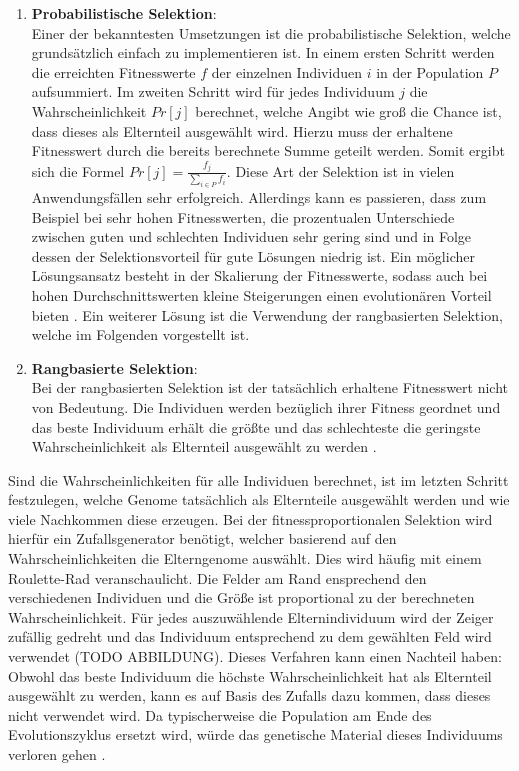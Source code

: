 \begin{enumerate}
	\item \textbf{Probabilistische Selektion}:\\
	Einer der bekanntesten Umsetzungen ist die probabilistische Selektion, welche grundsätzlich einfach zu implementieren ist. In einem ersten Schritt werden die erreichten Fitnesswerte $f$ der einzelnen Individuen $i$ in der Population $P$ aufsummiert. Im zweiten Schritt wird für jedes Individuum $j$ die Wahrscheinlichkeit $Pr[j]$ berechnet, welche Angibt wie groß die Chance ist, dass dieses als Elternteil ausgewählt wird. Hierzu muss der erhaltene Fitnesswert durch die bereits berechnete Summe geteilt werden. Somit ergibt sich die Formel $Pr[j]=\frac{f_j}{\sum_{i \in P}f_i}$. Diese Art der Selektion ist in vielen Anwendungsfällen sehr erfolgreich. Allerdings kann es passieren, dass zum Beispiel bei sehr hohen Fitnesswerten, die prozentualen Unterschiede zwischen guten und schlechten Individuen sehr gering sind und in Folge dessen der Selektionsvorteil für gute Lösungen niedrig ist. Ein möglicher Lösungsansatz besteht in der Skalierung der Fitnesswerte, sodass auch bei hohen Durchschnittswerten kleine Steigerungen einen evolutionären Vorteil bieten \cite{weicker2015evolutionare}. Ein weiterer Lösung ist die Verwendung der rangbasierten Selektion, welche im Folgenden vorgestellt ist.
	
	\item  \textbf{Rangbasierte Selektion}:\\
	Bei der rangbasierten Selektion ist der tatsächlich erhaltene Fitnesswert nicht von Bedeutung. Die Individuen werden bezüglich ihrer Fitness geordnet und das beste Individuum erhält die größte und das schlechteste die geringste Wahrscheinlichkeit als Elternteil ausgewählt zu werden \cite{weicker2015evolutionare}. 
\end{enumerate}
Sind die Wahrscheinlichkeiten für alle Individuen berechnet, ist im letzten Schritt festzulegen, welche Genome tatsächlich als Elternteile ausgewählt werden und wie viele Nachkommen diese erzeugen. Bei der fitnessproportionalen Selektion wird hierfür ein Zufallsgenerator benötigt, welcher basierend auf den Wahrscheinlichkeiten die Elterngenome auswählt. Dies wird häufig mit einem Roulette-Rad veranschaulicht. Die Felder am Rand ensprechend den verschiedenen Individuen und die Größe ist proportional zu der berechneten Wahrscheinlichkeit. Für jedes auszuwählende Elternindividuum wird der Zeiger zufällig gedreht und das Individuum  entsprechend zu dem gewählten Feld wird verwendet (TODO ABBILDUNG). Dieses Verfahren kann einen Nachteil haben: Obwohl das beste Individuum die höchste Wahrscheinlichkeit hat als Elternteil ausgewählt zu werden, kann es auf Basis des Zufalls dazu kommen, dass dieses nicht verwendet wird. Da typischerweise die Population am Ende des Evolutionszyklus ersetzt wird, würde das genetische Material dieses Individuums verloren gehen \cite{weicker2015evolutionare}. 
